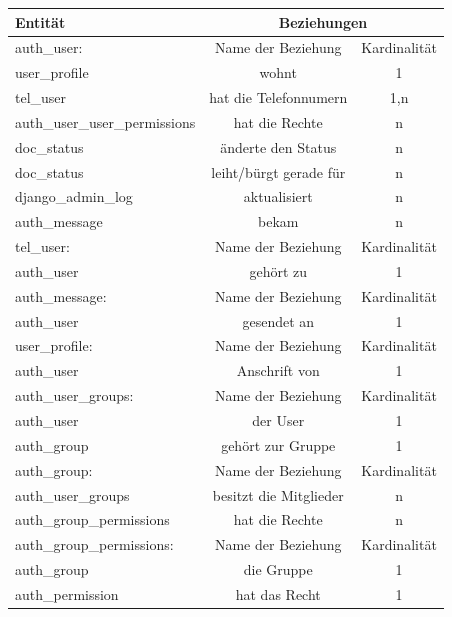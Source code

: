 \begin{tabular}[ht]{|l||c|c|}
  \hline
  Entit\"at & \multicolumn{2}{c|}{Beziehungen} \\
  \hline\hline\hline
    
  auth\_user: & Name der Beziehung & Kardinalität\\
  \hline\hline
  user\_profile & wohnt & 1\\
  \hline
  tel\_user & hat die Telefonnumern & 1,n\\
  \hline
  auth\_user\_user\_permissions & hat die Rechte & n\\
  \hline
  doc\_status & änderte den Status & n\\  
  \hline
  doc\_status & leiht/bürgt gerade für & n\\
  \hline
  django\_admin\_log & aktualisiert & n\\
  \hline
  auth\_message & bekam & n\\
  \hline\hline\hline
  
  tel\_user:  & Name der Beziehung &  Kardinalit\"at\\
  \hline\hline
  auth\_user & gehört zu & 1 \\
  \hline\hline\hline 
  
  auth\_message: & Name der Beziehung &  Kardinalit\"at\\
  \hline\hline
  auth\_user & gesendet an & 1 \\
  \hline\hline\hline 
  
  user\_profile:  & Name der Beziehung &  Kardinalit\"at\\
  \hline\hline
  auth\_user & Anschrift von & 1 \\
  \hline\hline\hline
  
  auth\_user\_groups:  & Name der Beziehung &  Kardinalit\"at\\
  \hline\hline
  auth\_user & der User & 1 \\
  \hline
  auth\_group & gehört zur Gruppe & 1 \\
  \hline\hline\hline
  
  auth\_group: & Name der Beziehung &  Kardinalit\"at\\
  \hline\hline
  auth\_user\_groups & besitzt die Mitglieder & n \\
  \hline
  auth\_group\_permissions & hat die Rechte & n \\
  \hline\hline\hline 

  auth\_group\_permissions: & Name der Beziehung &  Kardinalit\"at\\
  \hline\hline
  auth\_group & die Gruppe & 1 \\
  \hline
  auth\_permission & hat das Recht & 1 \\
  \hline\hline\hline 
  

\end{tabular}
